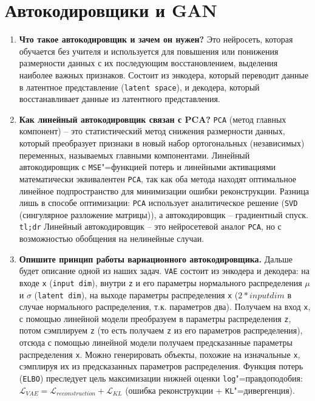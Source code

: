 \documentclass{article}
\begin{document}
\section{Автокодировщики и GAN}
\begin{enumerate}
    \item \textbf{Что такое автокодировщик и зачем он нужен?}
        Это нейросеть, которая обучается без учителя и используется для повышения или понижения размерности данных с их последующим восстановлением, выделения наиболее важных признаков. Состоит из энкодера, который переводит данные в латентное представление (\texttt{latent space}), и декодера, который восстанавливает данные из латентного представления.
    \item \textbf{Как линейный автокодировщик связан с PCA?}
        \texttt{PCA} (метод главных компонент) -- это статистический метод снижения размерности данных, который преобразует признаки в новый набор ортогональных (независимых) переменных, называемых главными компонентами. Линейный автокодировщик с \texttt{MSE}"=функцией потерь и линейными активациями математически эквивалентен \texttt{PCA}, так как оба метода находят оптимальное линейное подпространство для минимизации ошибки реконструкции. Разница лишь в способе оптимизации: \texttt{PCA} использует аналитическое решение (\texttt{SVD} (сингулярное разложение матрицы)), а автокодировщик -- градиентный спуск.\\
        \texttt{tl;dr} Линейный автокодировщик -- это нейросетевой аналог \texttt{PCA}, но с возможностью обобщения на нелинейные случаи.
    \item \textbf{Опишите принцип работы вариационного автокодировщика.}
        Дальше будет описание одной из наших задач. \texttt{VAE} состоит из энкодера и декодера: на входе \texttt{x} (\texttt{input dim}), внутри \texttt{z} и его параметры нормального распределения $\mu$ и $\sigma$ (\texttt{latent dim}), на выходе параметры распределения \texttt{x} ($2 * input dim$ в случае нормального распределения, т.к. параметров два). Получаем на вход \texttt{x}, с помощью линейной модели преобразуем в параметры распределения \texttt{z}, потом сэмплируем \texttt{z} (то есть получаем \texttt{z} из его параметров распределения), отсюда с помощью линейной модели получаем предсказанные параметры распределения \texttt{x}. Можно генерировать объекты, похожие на изначальные \texttt{x}, сэмплируя их из предсказанных параметров распределения. Функция потерь (\texttt{ELBO}) преследует цель максимизации нижней оценки \texttt{log}"=правдоподобия: $\mathcal{L}_{VAE} = \mathcal{L}_{reconstruction} + \mathcal{L}_{KL}$ (ошибка реконструкции + \texttt{KL}"=дивергенция).

\end{enumerate}
\end{document}
